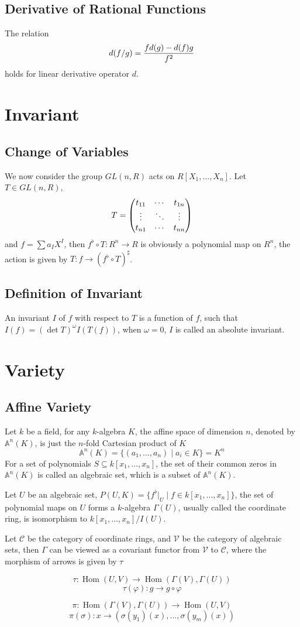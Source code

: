 \documentclass{article}
\def\hom{\mathop{\mathrm{Hom}}}
\begin{document}
\subsection{Derivative of Rational Functions}
The relation $$d(f/g) = {fd(g) - d(f)g \over f^2}$$ holds for linear derivative operator $d$.

\section{Invariant}
\subsection{Change of Variables}
We now consider the group $GL(n, R)$ acts on $R[X_1, \dots, X_n]$.
Let $T \in GL(n, R)$,
\begin{equation*}
  T = \left(\begin{matrix}
    t_{11} & \cdots & t_{1n} \cr
    \vdots & \ddots & \vdots \cr
    t_{n1} & \cdots & t_{nn}
\end{matrix}\right)
\end{equation*}
and $f = \sum a_I X^I$, then $f^\flat \circ T : R^n \to R$ is
obviously a polynomial map on $R^n$, the action is given by
$T : f \to (f^\flat \circ T)^\sharp$.


\subsection{Definition of Invariant}
An invariant $I$ of $f$ with respect to $T$ is a function of $f$,
such that $I(f) = (\det T)^\omega I(T(f))$, when $\omega = 0$,
$I$ is called an absolute invariant.


\section{Variety}
\subsection{Affine Variety}
Let $k$ be a field, for any $k$-algebra $K$, the affine space of dimension $n$,
denoted by $\mathbb A^n(K)$, is just the $n$-fold Cartesian product of $K$
$$\mathbb A^n(K) = \{(a_1, \dots, a_n) \mid a_i \in K\} = K^n$$
For a set of polynomials $S \subseteq k[x_1, \dots, x_n]$,
the set of their common zeros in $\mathbb A^n(K)$ is called an algebraic set,
which is a subset of $\mathbb A^n(K)$.

Let $U$ be an algebraic set, $P(U, K) = \{ f^\flat\vert_U \mid f \in k[x_1, \dots, x_n] \}$,
the set of polynomial maps on $U$ forms a $k$-algebra $\Gamma(U)$, usually called the coordinate ring,
is isomorphism to $k[x_1, \dots, x_n]/I(U)$.

Let $\mathcal C$ be the category of coordinate rings, and $\mathcal V$ be the category of algebraic sets,
then $\Gamma$ can be viewed as a covariant functor from $\mathcal V$ to $\mathcal C$, where the morphism of
arrows is given by $\tau$

$$\tau : \hom(U, V) \to \hom(\Gamma(V), \Gamma(U))$$
$$\tau(\varphi) : g \to g \circ \varphi$$

$$\pi : \hom(\Gamma(V), \Gamma(U)) \to \hom(U, V)$$
$$\pi(\sigma) : x \to (\sigma(y_1)(x), \dots, \sigma(y_m)(x))$$
\end{document}

